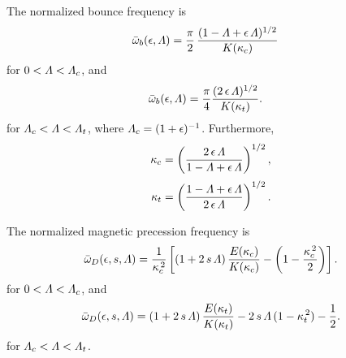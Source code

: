 \documentclass[12pt,prb,aps,notitlepage]{revtex4-1}
\begin{document}
The normalized bounce frequency is 
\begin{align}
\bar{\omega}_b(\epsilon,{\mit\Lambda}) &=\frac{\pi}{2}\,\frac{(1-{\mit\Lambda}+\epsilon\,{\mit\Lambda})^{1/2}}{K(\kappa_c)}
\end{align}
for $0<{\mit\Lambda}< {\mit\Lambda}_c$, and 
\begin{align}
\bar{\omega}_b(\epsilon,{\mit\Lambda}) &=\frac{\pi}{4}\frac{(2\,\epsilon\,{\mit\Lambda})^{1/2}}{K(\kappa_t)}.
\end{align}
for ${\mit\Lambda}_c< {\mit\Lambda} < {\mit\Lambda}_t$, where ${\mit\Lambda}_c= (1+\epsilon)^{-1}$. Furthermore,
\begin{align}
\kappa_c & =\left(\frac{2\,\epsilon\,{\mit\Lambda}}{1-{\mit\Lambda}+\epsilon\,{\mit\Lambda}}\right)^{1/2},\\[0.5ex]
\kappa_t &= \left(\frac{1-{\mit\Lambda}+\epsilon\,{\mit\Lambda}}{2\,\epsilon\,{\mit\Lambda}}\right)^{1/2}.
\end{align}

The normalized magnetic precession frequency is 
\begin{equation}
\bar{\omega}_D(\epsilon,s,{\mit\Lambda}) =\frac{1}{\kappa_c^{\,2}}\left[(1+2\,s\,{\mit\Lambda})\,\frac{E(\kappa_c)}{K(\kappa_c)} - \left(1-\frac{\kappa_c^{\,2}}{2}\right)\right].
\end{equation}
for $0<{\mit\Lambda}< {\mit\Lambda}_c$, and 
\begin{equation}
\bar{\omega}_D(\epsilon,s,{\mit\Lambda}) =(1+2\,s\,{\mit\Lambda})\,\frac{E(\kappa_t)}{K(\kappa_t)} -2\,s\,{\mit\Lambda}\,(1-\kappa_t^{\,2})-\frac{1}{2}.
\end{equation}
for ${\mit\Lambda}_c< {\mit\Lambda} < {\mit\Lambda}_t$.
\end{document}
